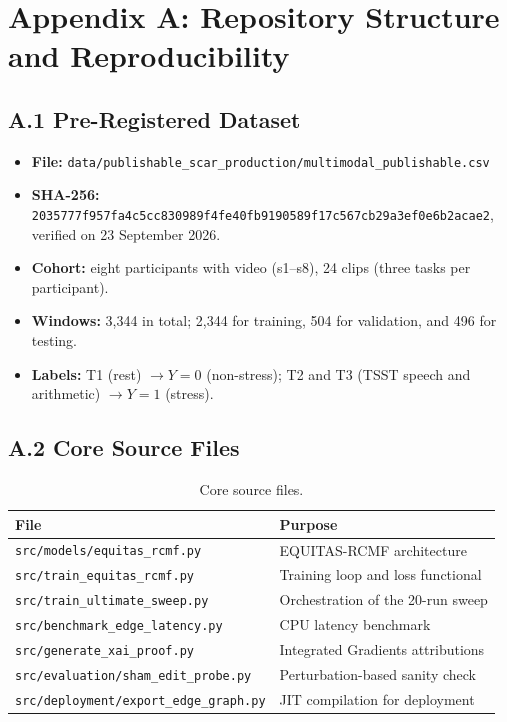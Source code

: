 \chapter*{Appendix A: Repository Structure and Reproducibility}

\section*{A.1 Pre-Registered Dataset}
\begin{itemize}
    \item \textbf{File:} \texttt{data/publishable\_scar\_production/multimodal\_publishable.csv}
    \item \textbf{SHA-256:} \texttt{2035777f957fa4c5cc830989f4fe40fb9190589f17c567cb29a3ef0e6b2acae2}, verified on 23 September 2026.
    \item \textbf{Cohort:} eight participants with video (s1--s8), 24 clips (three tasks per participant).
    \item \textbf{Windows:} 3,344 in total; 2,344 for training, 504 for validation, and 496 for testing.
    \item \textbf{Labels:} T1 (rest) $\rightarrow Y = 0$ (non-stress); T2 and T3 (TSST speech and arithmetic) $\rightarrow Y = 1$ (stress).
\end{itemize}

\section*{A.2 Core Source Files}
\begin{table}[htbp]
\centering
\begin{tabular}{@{}ll@{}}
\toprule
\textbf{File} & \textbf{Purpose} \\
\midrule
\texttt{src/models/equitas\_rcmf.py} & EQUITAS-RCMF architecture \\
\texttt{src/train\_equitas\_rcmf.py} & Training loop and loss functional \\
\texttt{src/train\_ultimate\_sweep.py} & Orchestration of the 20-run sweep \\
\texttt{src/benchmark\_edge\_latency.py} & CPU latency benchmark \\
\texttt{src/generate\_xai\_proof.py} & Integrated Gradients attributions \\
\texttt{src/evaluation/sham\_edit\_probe.py} & Perturbation-based sanity check \\
\texttt{src/deployment/export\_edge\_graph.py} & JIT compilation for deployment \\
\bottomrule
\end{tabular}
\caption{Core source files.}
\end{table}

